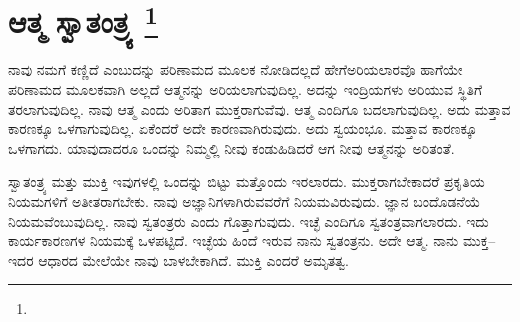 
\vspace{-0.6cm}

\chapter[ಆತ್ಮ ಸ್ವಾತಂತ್ರ್ಯ ]{ಆತ್ಮ ಸ್ವಾತಂತ್ರ್ಯ \protect\footnote{}}

ನಾವು ನಮಗೆ ಕಣ್ಣಿದೆ ಎಂಬುದನ್ನು ಪರಿಣಾಮದ ಮೂಲಕ ನೋಡಿದಲ್ಲದೆ ಹೇಗೆ\break ಅರಿಯಲಾರವೊ ಹಾಗೆಯೇ ಪರಿಣಾಮದ ಮೂಲಕವಾಗಿ ಅಲ್ಲದೆ ಆತ್ಮನನ್ನು ಅರಿಯಲಾಗುವುದಿಲ್ಲ. ಅದನ್ನು ಇಂದ್ರಿಯಗಳು ಅರಿಯುವ ಸ್ಥಿತಿಗೆ ತರಲಾಗುವುದಿಲ್ಲ. ನಾವು ಆತ್ಮ ಎಂದು ಅರಿತಾಗ ಮುಕ್ತರಾಗುವೆವು. ಆತ್ಮ ಎಂದಿಗೂ ಬದಲಾಗುವುದಿಲ್ಲ. ಅದು ಮತ್ತಾವ ಕಾರಣಕ್ಕೂ ಒಳಗಾಗುವುದಿಲ್ಲ. ಏಕೆಂದರೆ ಅದೇ ಕಾರಣವಾಗಿರುವುದು. ಅದು ಸ್ವಯಂಭೂ. ಮತ್ತಾವ ಕಾರಣಕ್ಕೂ ಒಳಗಾಗದು. ಯಾವುದಾದರೂ ಒಂದನ್ನು ನಿಮ್ಮಲ್ಲಿ ನೀವು ಕಂಡು\break ಹಿಡಿದರೆ ಆಗ ನೀವು ಆತ್ಮನನ್ನು ಅರಿತಂತೆ.

ಸ್ವಾತಂತ್ರ್ಯ ಮತ್ತು ಮುಕ್ತಿ ಇವುಗಳಲ್ಲಿ ಒಂದನ್ನು ಬಿಟ್ಟು ಮತ್ತೊಂದು ಇರಲಾರದು. ಮುಕ್ತರಾಗಬೇಕಾದರೆ ಪ್ರಕೃತಿಯ ನಿಯಮಗಳಿಗೆ ಅತೀತರಾಗಬೇಕು. ನಾವು ಅಜ್ಞಾನಿಗಳಾಗಿರುವವರೆಗೆ ನಿಯಮವಿರುವುದು. ಜ್ಞಾನ ಬಂದೊಡನೆಯೆ ನಿಯಮವೆಂಬುವುದಿಲ್ಲ. ನಾವು ಸ್ವತಂತ್ರರು ಎಂದು ಗೊತ್ತಾಗುವುದು. ಇಚ್ಛೆ ಎಂದಿಗೂ ಸ್ವತಂತ್ರವಾಗಲಾರದು. ಇದು ಕಾರ್ಯಕಾರಣಗಳ ನಿಯಮಕ್ಕೆ ಒಳಪಟ್ಟಿದೆ. ಇಚ್ಛೆಯ ಹಿಂದೆ ಇರುವ ನಾನು ಸ್ವತಂತ್ರನು. ಅದೇ ಆತ್ಮ. ನಾನು ಮುಕ್ತ–ಇದರ ಆಧಾರದ ಮೇಲೆಯೇ ನಾವು ಬಾಳಬೇಕಾಗಿದೆ. ಮುಕ್ತಿ ಎಂದರೆ ಅಮೃತತ್ವ.

